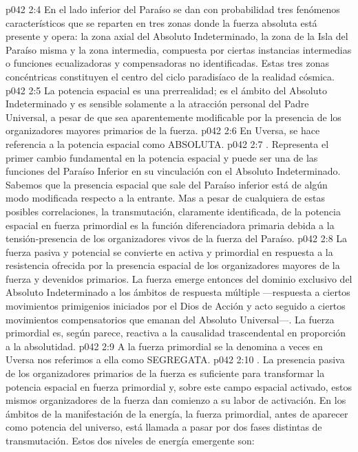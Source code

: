 \vs p042 2:4 En el lado inferior del Paraíso se dan con probabilidad tres fenómenos característicos que se reparten en tres zonas donde la fuerza absoluta está presente y opera: la zona axial del Absoluto Indeterminado, la zona de la Isla del Paraíso misma y la zona intermedia, compuesta por ciertas instancias intermedias o funciones ecualizadoras y compensadoras no identificadas. Estas tres zonas concéntricas constituyen el centro del ciclo paradisíaco de la realidad cósmica.
\vs p042 2:5 La potencia espacial es una prerrealidad; es el ámbito del Absoluto Indeterminado y es sensible solamente a la atracción personal del Padre Universal, a pesar de que sea aparentemente modificable por la presencia de los organizadores mayores primarios de la fuerza.
\vs p042 2:6 En Uversa, se hace referencia a la potencia espacial como ABSOLUTA.
\vs p042 2:7 . Representa el primer cambio fundamental en la potencia espacial y puede ser una de las funciones del Paraíso Inferior en su vinculación con el Absoluto Indeterminado. Sabemos que la presencia espacial que sale del Paraíso inferior está de algún modo modificada respecto a la entrante. Mas a pesar de cualquiera de estas posibles correlaciones, la transmutación, claramente identificada, de la potencia espacial en fuerza primordial es la función diferenciadora primaria debida a la tensión\hyp{}presencia de los organizadores vivos de la fuerza del Paraíso.
\vs p042 2:8 La fuerza pasiva y potencial se convierte en activa y primordial en respuesta a la resistencia ofrecida por la presencia espacial de los organizadores mayores de la fuerza y devenidos primarios. La fuerza emerge entonces del dominio exclusivo del Absoluto Indeterminado a los ámbitos de respuesta múltiple ---respuesta a ciertos movimientos primigenios iniciados por el Dios de Acción y acto seguido a ciertos movimientos compensatorios que emanan del Absoluto Universal---. La fuerza primordial es, según parece, reactiva a la causalidad trascendental en proporción a la absolutidad.
\vs p042 2:9 A la fuerza primordial se la denomina a veces  en Uversa nos referimos a ella como SEGREGATA.
\vs p042 2:10 . La presencia pasiva de los organizadores primarios de la fuerza es suficiente para transformar la potencia espacial en fuerza primordial y, sobre este campo espacial activado, estos mismos organizadores de la fuerza dan comienzo a su labor de activación. En los ámbitos de la manifestación de la energía, la fuerza primordial, antes de aparecer como potencia del universo, está llamada a pasar por dos fases distintas de transmutación. Estos dos niveles de energía emergente son:
